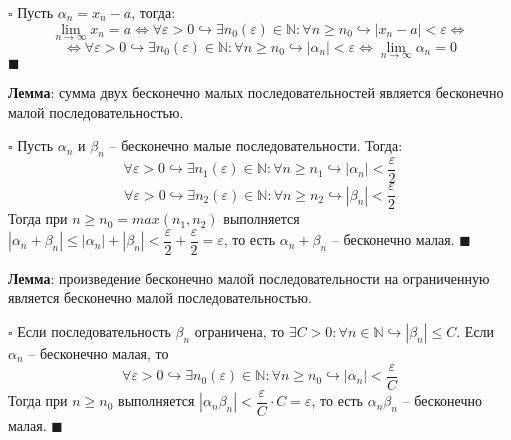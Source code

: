 \documentclass[12pt, a4paper, reqno]{article}
\begin{document}
    $\square$ Пусть $\alpha_n = x_n - a$, тогда:
    \begin{equation*}
    \lim\limits_{n\to\infty} x_n = a \iff \forall\varepsilon > 0 \hookrightarrow \exists
    n_0(\varepsilon)\in\mathbb{N}: \forall n \geq n_0 \hookrightarrow |x_n - a| < \varepsilon \iff
    \end{equation*}
    \begin{equation*}
    \iff \forall\varepsilon > 0 \hookrightarrow \exists n_0(\varepsilon)\in\mathbb{N}: \forall n
    \geq n_0 \hookrightarrow |\alpha_n| < \varepsilon \iff \lim\limits_{n\to\infty} \alpha_n = 0
    \end{equation*}
    $\blacksquare$

    \textbf{Лемма}: сумма двух бесконечно малых последовательностей является бесконечно малой
    последовательностью.

    $\square$ Пусть $\alpha_n$ и $\beta_n$ -- бесконечно малые последовательности. Тогда:
    \begin{equation*}
        \forall\varepsilon > 0 \hookrightarrow \exists n_1(\varepsilon)\in\mathbb{N}: \forall n
        \geq n_1 \hookrightarrow |\alpha_n| < \dfrac{\varepsilon}{2}
    \end{equation*}
    \begin{equation*}
        \forall\varepsilon > 0 \hookrightarrow \exists n_2(\varepsilon)\in\mathbb{N}: \forall n
        \geq n_2 \hookrightarrow |\beta_n| < \dfrac{\varepsilon}{2}
    \end{equation*}
    Тогда при $n \geq n_0 = max(n_1, n_2)$ выполняется $|\alpha_n + \beta_n|\leq |\alpha_n| +
    |\beta_n| < \dfrac{\varepsilon}{2} + \dfrac{\varepsilon}{2} = \varepsilon$, то есть $\alpha_n +
    \beta_n$ -- бесконечно малая. $\blacksquare$

    \textbf{Лемма}: произведение бесконечно малой последовательности на ограниченную является
    бесконечно малой последовательностью.

    $\square$ Если последовательность $\beta_n$ ограничена, то $\exists C > 0:
    \forall n\in\mathbb{N} \hookrightarrow |\beta_n|\leq C$. Если $\alpha_n$ -- бесконечно малая, то
    \begin{equation*}
        \forall\varepsilon > 0 \hookrightarrow \exists n_0(\varepsilon)\in\mathbb{N}: \forall n
        \geq n_0 \hookrightarrow |\alpha_n| < \dfrac{\varepsilon}{C}
    \end{equation*}
    Тогда при $n \geq n_0$ выполняется $|\alpha_n\beta_n| < \dfrac{\varepsilon}{C}\cdot C =
    \varepsilon$, то есть $\alpha_n\beta_n$ -- бесконечно малая. $\blacksquare$
\end{document}
